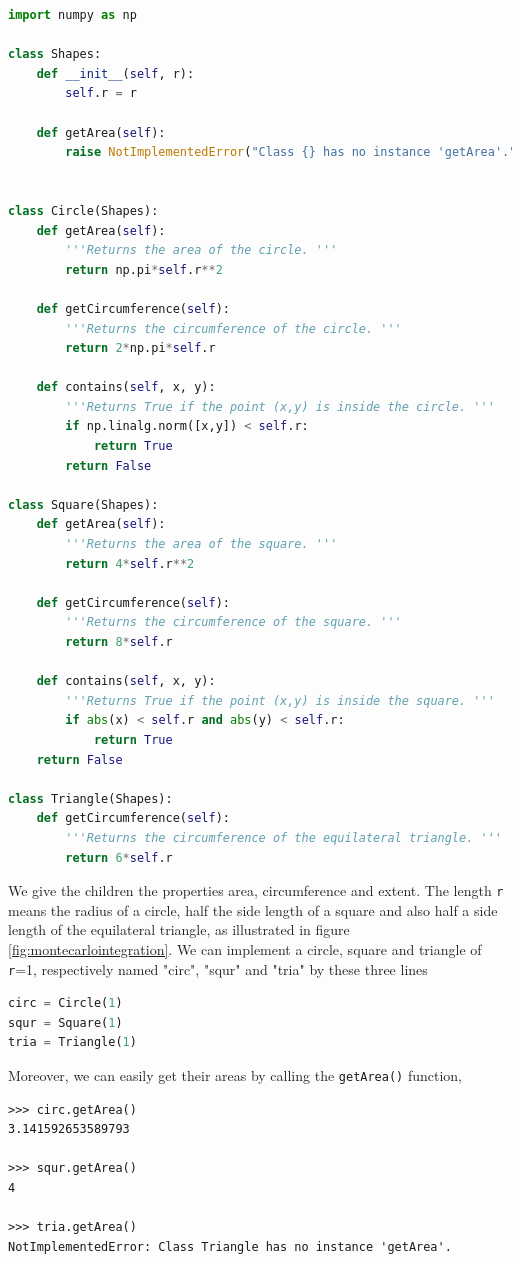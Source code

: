 \lstset{basicstyle=\scriptsize}
\begin{lstlisting}[language=python, caption={Geometric shapes implemented in object-oriented Python.}, label={lst:python}]
import numpy as np

class Shapes:
	def __init__(self, r):
		self.r = r

	def getArea(self):
		raise NotImplementedError("Class {} has no instance 'getArea'.".format(self.__class__.__name__))


class Circle(Shapes):
	def getArea(self):
		'''Returns the area of the circle. '''
		return np.pi*self.r**2

	def getCircumference(self):
		'''Returns the circumference of the circle. '''
		return 2*np.pi*self.r

	def contains(self, x, y):
		'''Returns True if the point (x,y) is inside the circle. '''
		if np.linalg.norm([x,y]) < self.r:
			return True
		return False

class Square(Shapes):
	def getArea(self):
		'''Returns the area of the square. '''
		return 4*self.r**2

	def getCircumference(self):
		'''Returns the circumference of the square. '''
		return 8*self.r

	def contains(self, x, y):
		'''Returns True if the point (x,y) is inside the square. '''
		if abs(x) < self.r and abs(y) < self.r:
			return True
	return False

class Triangle(Shapes):
	def getCircumference(self):
		'''Returns the circumference of the equilateral triangle. '''
		return 6*self.r
\end{lstlisting}
We give the children the properties area, circumference and extent. The length \texttt{r} means the radius of a circle, half the side length of a square and also half a side length of the equilateral triangle, as illustrated in figure \eqref{fig:montecarlointegration}. We can implement a circle, square and triangle of \texttt{r}=1, respectively named "circ", "squr" and "tria" by these three lines
\lstset{basicstyle=\scriptsize}
\begin{lstlisting}[language=python]
circ = Circle(1)
squr = Square(1)
tria = Triangle(1)
\end{lstlisting}
Moreover, we can easily get their areas by calling the \texttt{getArea()} function,
\lstset{basicstyle=\scriptsize}
\begin{lstlisting}
>>> circ.getArea()
3.141592653589793

>>> squr.getArea()
4

>>> tria.getArea()
NotImplementedError: Class Triangle has no instance 'getArea'.
\end{lstlisting}

